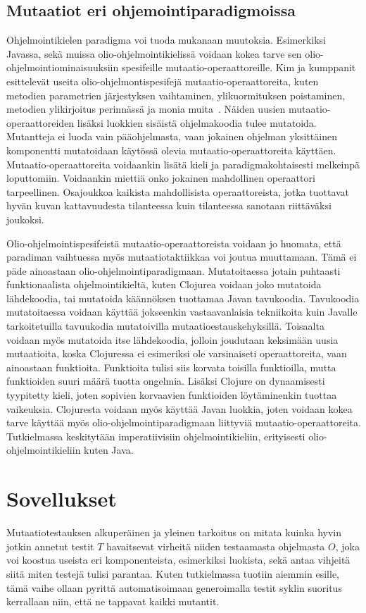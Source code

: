 \documentclass{tktltiki}
\begin{document}
\subsection{Mutaatiot eri ohjemointiparadigmoissa}
Ohjelmointikielen paradigma voi tuoda mukanaan muutoksia. Esimerkiksi Javassa, sekä muissa olio-ohjelmointikielissä voidaan kokea tarve sen olio-ohjelmointiominaisuuksiin spesifeille mutaatio-operaattoreille. Kim ja kumppanit esittelevät useita olio-ohjelmontispesifejä mutaatio-operaattoreita, kuten metodien parametrien järjestyksen vaihtaminen, ylikuormituksen poistaminen, metodien ylikirjoitus perinnässä ja monia muita~\cite{}. Näiden uusien mutaatio-operaattoreiden lisäksi luokkien sisäistä ohjelmakoodia tulee mutatoida. Mutantteja ei luoda vain pääohjelmasta, vaan jokainen ohjelman yksittäinen komponentti mutatoidaan käytössä olevia mutaatio-operaattoreita käyttäen. Mutaatio-operaattoreita voidaankin lisätä kieli ja paradigmakohtaisesti melkeinpä loputtomiin. Voidaankin miettiä onko jokainen mahdollinen operaattori tarpeellinen. Osajoukkoa kaikista mahdollisista operaattoreista, jotka tuottavat hyvän kuvan kattavuudesta tilanteessa kuin tilanteessa sanotaan riittäväksi joukoksi.

Olio-ohjelmointispesifeistä mutaatio-operaattoreista voidaan jo huomata, että paradiman vaihtuessa myös mutaatiotaktiikkaa voi joutua muuttamaan. Tämä ei päde ainoastaan olio-ohjelmointiparadigmaan. Mutatoitaessa jotain puhtaasti funktionaalista ohjelmointikieltä, kuten Clojurea voidaan joko mutatoida lähdekoodia, tai mutatoida käännöksen tuottamaa Javan tavukoodia. Tavukoodia mutatoitaessa voidaan käyttää jokseenkin vastaavanlaisia tekniikoita kuin Javalle tarkoitetuilla tavuukodia mutatoivilla mutaatioestauskehyksillä. Toisaalta voidaan myös mutatoida itse lähdekoodia, jolloin joudutaan keksimään uusia mutaatioita, koska Clojuressa ei esimeriksi ole varsinaiseti operaattoreita, vaan ainoastaan funktioita. Funktioita tulisi siis korvata toisilla funktioilla, mutta funktioiden suuri määrä tuotta ongelmia. Lisäksi Clojure on dynaamisesti tyypitetty kieli, joten sopivien korvaavien funktioiden löytäminenkin tuottaa vaikeuksia. Clojuresta voidaan myös käyttää Javan luokkia, joten voidaan kokea tarve käyttää myös olio-ohjelmointiparadigmaan liittyviä mutaatio-operaattoreita. Tutkielmassa keskitytään imperatiivisiin ohjelmointikieliin, erityisesti olio-ohjelmointikieliin kuten Java.

\section{Sovellukset}
Mutaatiotestauksen alkuperäinen ja yleinen tarkoitus on mitata kuinka hyvin jotkin annetut testit $T$ havaitsevat virheitä niiden testaamasta ohjelmasta $O$, joka voi koostua useista eri komponenteista, esimerkiksi luokista, sekä antaa vihjeitä siitä miten testejä tulisi parantaa. Kuten tutkielmassa tuotiin aiemmin esille, tämä vaihe ollaan pyrittä automatisoimaan generoimalla testit syklin suoritus kerrallaan niin, että ne tappavat kaikki mutantit.
\end{document}
